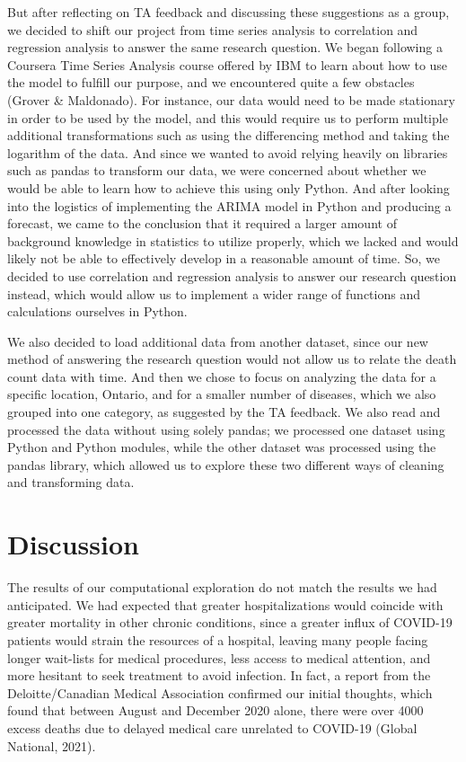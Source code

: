 \documentclass[fontsize=11pt]{article}
\begin{document}
\noindent
But after reflecting on TA feedback and discussing these suggestions as a group, we decided to shift our project from time series analysis to correlation and regression analysis to answer the same research question. We began following a Coursera Time Series Analysis course offered by IBM to learn about how to use the model to fulfill our purpose, and we encountered quite a few obstacles (Grover \& Maldonado). For instance, our data would need to be made stationary in order to be used by the model, and this would require us to perform multiple additional transformations such as using the differencing method and taking the logarithm of the data. And since we wanted to avoid relying heavily on libraries such as pandas to transform our data, we were concerned about whether we would be able to learn how to achieve this using only Python. And after looking into the logistics of implementing the ARIMA model in Python and producing a forecast, we came to the conclusion that it required a larger amount of background knowledge in statistics to utilize properly, which we lacked and would likely not be able to effectively develop in a reasonable amount of time. So, we decided to use correlation and regression analysis to answer our research question instead, which would allow us to implement a wider range of functions and calculations ourselves in Python.

\noindent
We also decided to load additional data from another dataset, since our new method of answering the research question would not allow us to relate the death count data with time. And then we chose to focus on analyzing the data for a specific location, Ontario, and for a smaller number of diseases, which we also grouped into one category, as suggested by the TA feedback. We also read and processed the data without using solely pandas; we processed one dataset using Python and Python modules, while the other dataset was processed using the pandas library, which allowed us to explore these two different ways of cleaning and transforming data. 

\section*{Discussion}
The results of our computational exploration do not match the results we had anticipated. We had expected that greater hospitalizations would coincide with greater mortality in other chronic conditions, since a greater influx of COVID-19 patients would strain the resources of a hospital, leaving many people facing longer wait-lists for medical procedures, less access to medical attention, and more hesitant to seek treatment to avoid infection. In fact, a report from the Deloitte/Canadian Medical Association confirmed our initial thoughts, which found that between August and December 2020 alone, there were over 4000 excess deaths due to delayed medical care unrelated to COVID-19 (Global National, 2021).
\end{document}
